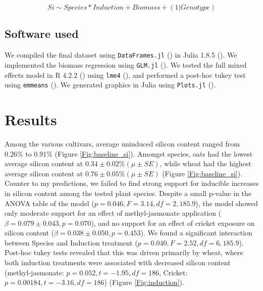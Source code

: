 \documentclass[12pt, letterpaper, ]{report}
\begin{document}
\[Si \sim Species * Induction + Biomass + (1|Genotype)\]



\subsection{Software used}

We compiled the final dataset using \verb|DataFrames.jl| (\cite{bogumil_kaminski_2023_7632427}) in Julia 1.8.5 (\cite{bezanson2017julia}). We implemented the biomass regression using \verb|GLM.jl| (\cite{douglas_bates_2023_7529836}). We tested the full mixed effects model in R 4.2.2 (\cite{r_core_team_2022}) using \verb|lme4| (\cite{lme4_bates_2015}), and performed a post-hoc tukey test using \verb|emmeans| (\cite{lenth_2023_emmeans}). We generated graphics in Julia using \verb|Plots.jl| (\cite{tom_breloff_2023_7736124}). 

\section{Results}
Among the various cultivars, average uninduced silicon content ranged from 0.26\% to 0.91\% (Figure \ref{Fig:baseline_si}). Amongst species, oats had the lowest average silicon content at $0.34 \pm 0.02\% (\mu \pm SE)$, while wheat had the highest average silicon content at $0.76 \pm 0.05\% (\mu \pm SE)$ (Figure \ref{Fig:baseline_si}). Counter to my predictions, we failed to find strong support for inducible increases in silicon content among the tested plant species. Despite a small p-value in the ANOVA table of the model ($p = 0.046, F = 3.14, df = 2,185.9$), the model showed only moderate support for an effect of methyl-jasmonate application ($\beta = 0.079 \pm 0.043, p = 0.070$), and no support for an effect of cricket exposure on silicon content ($\beta = 0.038 \pm 0.050, p = 0.453$). We found a significant interaction between Species and Induction treatment ($p = 0.040, F = 2.52, df = 6,185.9$). Post-hoc tukey tests revealed that this was driven primarily by wheat, where both induction treatments were associated with decreased silicon content (methyl-jasmonate: $p = 0.052, t = -1.95, df = 186$, Cricket: $p = 0.00184, t = -3.16, df = 186$) (Figure \ref{Fig:induction}).
\end{document}
